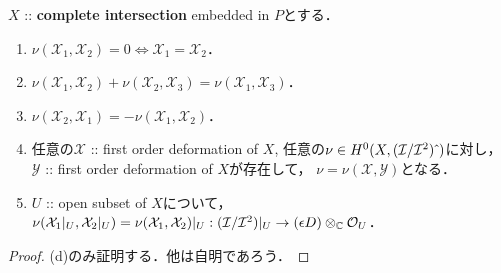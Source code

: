 \documentclass[a4paper]{jsarticle}
\newcommand{\famX}{\mathcal{X}}
\newcommand{\famY}{\mathcal{Y}}
\begin{document}
    \begin{Prop}
        $X$ :: \textbf{complete intersection} embedded in $P$とする．
        \begin{enumerate}[label=(\alph*), leftmargin=*]
            \item $\nu(\famX_1, \famX_2)=0 \iff \famX_1=\famX_2$．

            \item $\nu(\famX_1, \famX_2)+\nu(\famX_2, \famX_3)=\nu(\famX_1, \famX_3)$．

            \item $\nu(\famX_2, \famX_1)=-\nu(\famX_1, \famX_2)$．

            \item
                任意の$\famX$ :: first order deformation of $X$, 
                任意の$\nu \in H^0(X, (\mathcal{I}/\mathcal{I}^2)\,\hat{}\,)$に対し，
                $\famY$ :: first order deformation of $X$が存在して，
                $\nu=\nu(\famX, \famY)$となる．

            \item
                $U$ :: open subset of $X$について，
                $\nu(\famX_1|_U, \famX_2|_U)=\nu(\famX_1, \famX_2)|_U:
                (\shI/\shI^2)|_U \to (\epsilon D) \otimes_{\C} \shO_U$．
        \end{enumerate}
    \end{Prop}
    \begin{proof}
        (d)のみ証明する．他は自明であろう．
    \end{proof}
\end{document}
